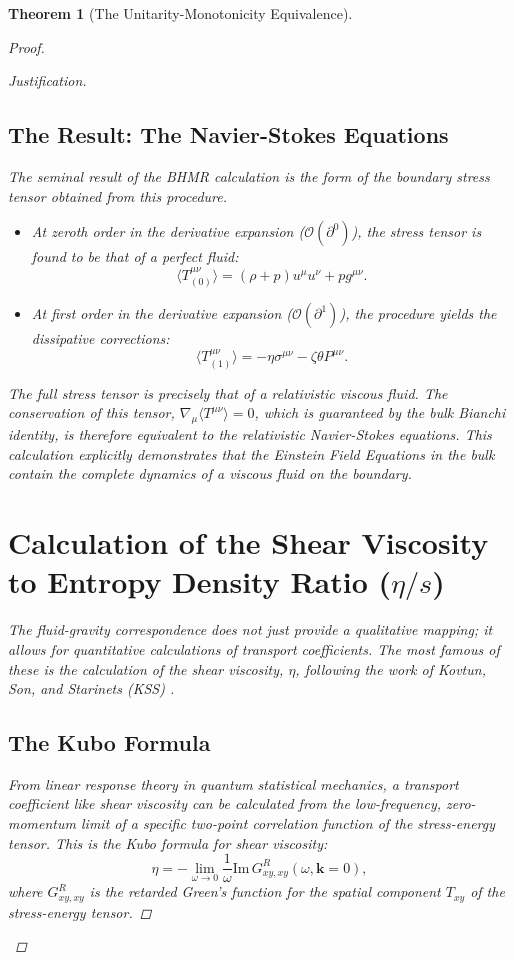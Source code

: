 \documentclass[11pt, letterpaper]{report}
\theoremstyle{plain} %
\newtheorem{theorem}{Theorem}[chapter]
\theoremstyle{definition} %
\theoremstyle{remark} %
\begin{document}
\begin{theorem}[The Unitarity-Monotonicity Equivalence]
\begin{proof}
\begin{proof}[Justification]
\subsection{The Result: The Navier-Stokes Equations}
The seminal result of the BHMR calculation is the form of the boundary stress tensor obtained from this procedure.
\begin{itemize}
    \item At zeroth order in the derivative expansion ($\mathcal{O}(\partial^0)$), the stress tensor is found to be that of a perfect fluid:
    $$ \langle T^{\mu\nu}_{(0)} \rangle = (\rho+p)u^\mu u^\nu + p g^{\mu\nu}. $$
    \item At first order in the derivative expansion ($\mathcal{O}(\partial^1)$), the procedure yields the dissipative corrections:
    $$ \langle T^{\mu\nu}_{(1)} \rangle = -\eta \sigma^{\mu\nu} - \zeta \theta P^{\mu\nu}. $$
\end{itemize}
The full stress tensor is precisely that of a relativistic viscous fluid. The conservation of this tensor, $\nabla_\mu \langle T^{\mu\nu} \rangle = 0$, which is guaranteed by the bulk Bianchi identity, is therefore equivalent to the relativistic Navier-Stokes equations. This calculation explicitly demonstrates that the Einstein Field Equations in the bulk contain the complete dynamics of a viscous fluid on the boundary.

\section{Calculation of the Shear Viscosity to Entropy Density Ratio (\texorpdfstring{$\eta/s$}{eta/s})}
\label{app:kss_bound}

The fluid-gravity correspondence does not just provide a qualitative mapping; it allows for quantitative calculations of transport coefficients. The most famous of these is the calculation of the shear viscosity, $\eta$, following the work of Kovtun, Son, and Starinets (KSS) \cite{Kovtun2005Viscosity,Policastro2001AdSCFT}.

\subsection{The Kubo Formula}
From linear response theory in quantum statistical mechanics, a transport coefficient like shear viscosity can be calculated from the low-frequency, zero-momentum limit of a specific two-point correlation function of the stress-energy tensor. This is the Kubo formula for shear viscosity:
\begin{equation}
    \eta = -\lim_{\omega \to 0} \frac{1}{\omega} \text{Im} \, G^R_{xy,xy}(\omega, \mathbf{k}=0),
\end{equation}
where $G^R_{xy,xy}$ is the retarded Green's function for the spatial component $T_{xy}$ of the stress-energy tensor.


\end{proof}
\end{proof}
\end{theorem}
\end{document}
